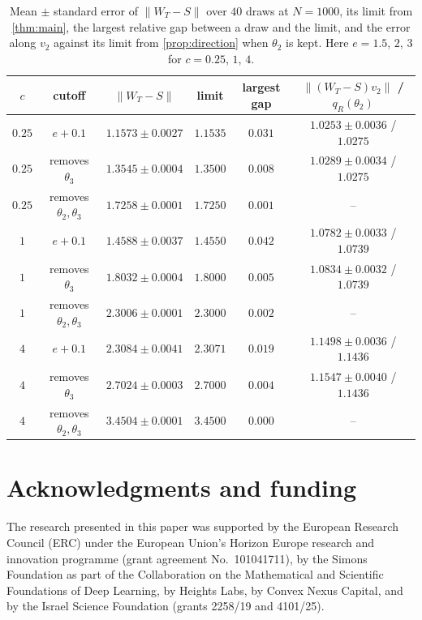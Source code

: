 \documentclass[11pt]{amsart}
\theoremstyle{remark}
\numberwithin{equation}{section}
\begin{document}
\begin{table}[ht]
\centering
\footnotesize
\setlength{\tabcolsep}{4pt}
\begin{tabular}{cccccc}
\toprule
$c$ & cutoff & $\|W_T-S\|$ & limit & largest gap & $\|(W_T-S)v_2\|$ / $q_R(\theta_2)$\\
\midrule
$0.25$ & $e+0.1$ & $1.1573\pm0.0027$ & $1.1535$ & $0.031$ & $1.0253\pm0.0036$ / $1.0275$\\
$0.25$ & removes $\theta_3$ & $1.3545\pm0.0004$ & $1.3500$ & $0.008$ & $1.0289\pm0.0034$ / $1.0275$\\
$0.25$ & removes $\theta_2,\theta_3$ & $1.7258\pm0.0001$ & $1.7250$ & $0.001$ & --\\
$1$ & $e+0.1$ & $1.4588\pm0.0037$ & $1.4550$ & $0.042$ & $1.0782\pm0.0033$ / $1.0739$\\
$1$ & removes $\theta_3$ & $1.8032\pm0.0004$ & $1.8000$ & $0.005$ & $1.0834\pm0.0032$ / $1.0739$\\
$1$ & removes $\theta_2,\theta_3$ & $2.3006\pm0.0001$ & $2.3000$ & $0.002$ & --\\
$4$ & $e+0.1$ & $2.3084\pm0.0041$ & $2.3071$ & $0.019$ & $1.1498\pm0.0036$ / $1.1436$\\
$4$ & removes $\theta_3$ & $2.7024\pm0.0003$ & $2.7000$ & $0.004$ & $1.1547\pm0.0040$ / $1.1436$\\
$4$ & removes $\theta_2,\theta_3$ & $3.4504\pm0.0001$ & $3.4500$ & $0.000$ & --\\
\bottomrule
\end{tabular}
\caption{Mean $\pm$ standard error of $\|W_T-S\|$ over $40$ draws at $N=1000$, its limit from \cref{thm:main}, the largest relative gap between a draw and the limit, and the error along $v_2$ against its limit from \cref{prop:direction} when $\theta_2$ is kept. Here $e=1.5$, $2$, $3$ for $c=0.25$, $1$, $4$.}
\label{tab:sim}
\end{table}

\section*{Acknowledgments and funding}
The research presented in this paper was supported by the European Research Council (ERC) under the European Union's Horizon Europe research and innovation programme (grant agreement No.~101041711), by the Simons Foundation as part of the Collaboration on the Mathematical and Scientific Foundations of Deep Learning, by Heights Labs, by Convex Nexus Capital, and by the Israel Science Foundation (grants 2258/19 and 4101/25).
\end{document}
